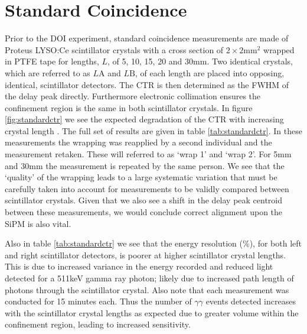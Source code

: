 \section{Standard Coincidence}
\label{sec:standardctr}
Prior to the DOI experiment, standard coincidence measurements are made of Proteus LYSO:Ce scintillator crystals with a cross section of $2\times2$mm$^2$ wrapped in PTFE tape for lengths, $L$, of 5, 10, 15, 20 and 30mm. Two identical crystals, which are referred to as $L\text{A}$ and $L\text{B}$, of each length are placed into opposing, identical, scintillator detectors. The CTR is then determined as the FWHM of the delay peak directly. Furthermore electronic collimation ensures the confinement region is the same in both scintillator crystals. In figure \ref{fig:standardctr} we see the expected degradation of the CTR with increasing crystal length \cite{r_Paganoni_Pauwels_et_al__2011}\cite{Wiener_Kaul_Surti_Karp_2010}\cite{Choong_2009}\cite{Gola_Piemonte_Tarolli_2013}\cite{o_Pro_Serra_Tarolli_Zorzi_2011}. The full set of results are given in table \ref{tab:standardctr}. In these measurements the wrapping was reapplied by a second individual and the measurement retaken. These will referred to as `wrap 1' and `wrap 2'. For 5mm and 30mm the measurement is repeated by the same person. We see that the `quality' of the wrapping leads to a large systematic variation that must be carefully taken into account for measurements to be validly compared between scintillator crystals. Given that we also see a shift in the delay peak centroid between these measurements, we would conclude correct alignment upon the SiPM is also vital. 

Also in table \ref{tab:standardctr} we see that the energy resolution (\%), for both left and right scintillator detectors, is poorer at higher scintillator crystal lengths. This is due to increased variance in the energy recorded and reduced light detected for a 511keV gamma ray photon; likely due to increased path length of photons through the scintillator crystal. Also note that each measurement was conducted for 15 minutes each. Thus the number of $\gamma\gamma$ events detected increases with the scintillator crystal lengths as expected  due to greater volume within the confinement region, leading to increased sensitivity.
